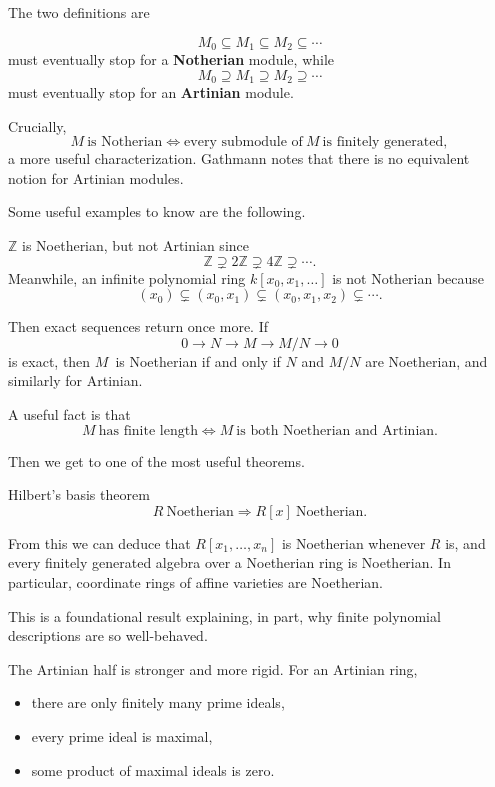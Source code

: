 \documentclass[11pt]{article}
\begin{document}
The two definitions are 
\begin{defn}
    \[
        M_0 \subseteq M_1 \subseteq M_2 \subseteq \cdots 
    \]
    must eventually stop for a \textbf{Notherian} module, 
    while 
    \[
        M_0 \supseteq M_1\supseteq M_2\supseteq \cdots
    \]
    must eventually stop for an \textbf{Artinian} module. 
\end{defn} 

Crucially, 
\[
    M \ \text{is Notherian} \Leftrightarrow 
    \text{every submodule of} \ M \ \text{is finitely generated}, 
\]
a more useful characterization. 
Gathmann notes that there is no equivalent notion for 
Artinian modules. 

Some useful examples to know are the following. 

$\mathbb Z$ is Noetherian, but not Artinian since 
\[
    \mathbb Z \supsetneq 2\mathbb Z \supsetneq 
    4\mathbb Z \supsetneq \cdots. 
\]
Meanwhile, an infinite polynomial ring $k[x_0,x_1,\ldots]$ 
is not Notherian because 
\[
    (x_0) \subsetneq (x_0,x_1) \subsetneq (x_0,x_1,x_2) 
    \subsetneq \cdots. 
\]

Then exact sequences return once more. 
If 
\[
    0 \to N \to M \to M/N \to 0
\]
is exact, then $M$ is Noetherian if and only if $N$ and 
$M/N$ are Noetherian, and similarly for Artinian.  

A useful fact is that 
\[
    M \ \text{has finite length} \Leftrightarrow 
    M \ \text{is both Noetherian and Artinian}. 
\]

Then we get to one of the most useful theorems. 

\begin{thm}{Hilbert's basis theorem}
    \[
        R \ \text{Noetherian} 
        \Rightarrow R[x] \ \text{Noetherian}.
    \]
\end{thm}

From this we can deduce that $R[x_1,\ldots,x_n]$ is Noetherian 
whenever $R$ is, and every finitely generated algebra over 
a Noetherian ring is Noetherian.
In particular, coordinate rings of affine varieties are 
Noetherian. 

This is a foundational result explaining, in part, why 
finite polynomial descriptions are so well-behaved. 

The Artinian half is stronger and more rigid. 
For an Artinian ring, 
\begin{itemize}
    \item there are only finitely many prime ideals, 
    \item every prime ideal is maximal, 
    \item some product of maximal ideals is zero. 
\end{itemize}
\end{document}
